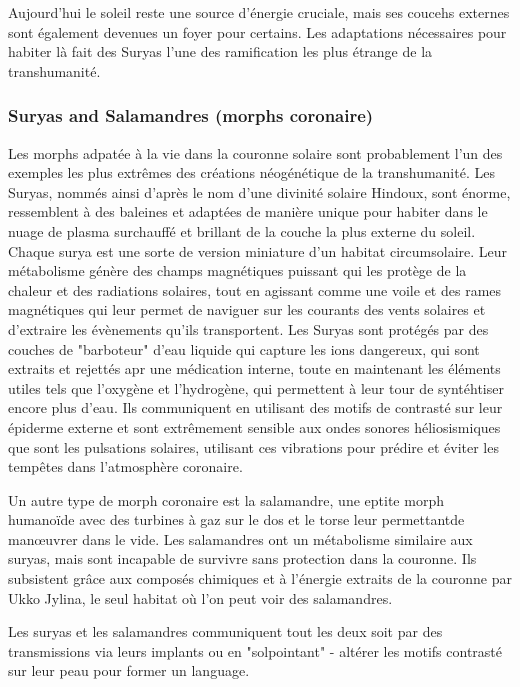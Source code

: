 Aujourd'hui le soleil reste une source d'énergie cruciale, mais ses coucehs externes sont également devenues un foyer pour certains. Les adaptations nécessaires pour habiter là fait des Suryas l'une des ramification les plus étrange de la transhumanité. 

\subsubsection{Suryas and Salamandres (morphs coronaire)} \label{sec:sury-salam-coron} 

Les morphs adpatée à la vie dans la couronne solaire sont probablement l'un des exemples les plus extrêmes des créations néogénétique de la transhumanité. Les Suryas, nommés ainsi d'après le nom d'une divinité solaire Hindoux, sont énorme, ressemblent à des baleines et adaptées de manière unique pour habiter dans le nuage de plasma surchauffé et brillant de la couche la plus externe du soleil. Chaque surya est une sorte de version miniature d'un habitat circumsolaire. Leur métabolisme génère des champs magnétiques puissant qui les protège de la chaleur et des radiations solaires, tout en agissant comme une voile et des rames magnétiques qui leur permet de naviguer sur les courants des vents solaires et d'extraire les évènements qu'ils transportent. Les Suryas sont protégés par des couches de "barboteur" d'eau liquide qui capture les ions dangereux, qui sont extraits et rejettés apr une médication interne, toute en maintenant les éléments utiles tels que l'oxygène et l'hydrogène, qui permettent à leur tour de syntéhtiser encore plus d'eau. Ils communiquent en utilisant des motifs de contrasté sur leur épiderme externe et sont extrêmement sensible aux ondes sonores héliosismiques que sont les pulsations solaires, utilisant ces vibrations pour prédire et éviter les tempêtes dans l'atmosphère coronaire. 

Un autre type de morph coronaire est la salamandre, une eptite morph humanoïde avec des turbines à gaz sur le dos et le torse leur permettantde manœuvrer dans le vide. Les salamandres ont un métabolisme similaire aux suryas, mais sont incapable de survivre sans protection dans la couronne. Ils subsistent grâce aux composés chimiques et à l'énergie extraits de la couronne par Ukko Jylina, le seul habitat où l'on peut voir des salamandres. 

Les suryas et les salamandres communiquent tout les deux soit par des transmissions via leurs implants ou en "solpointant" - altérer les motifs contrasté sur leur peau pour former un language. 


